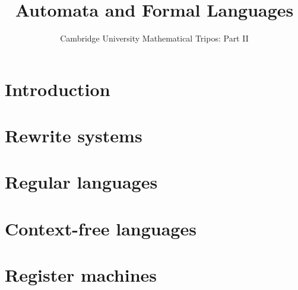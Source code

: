 \documentclass{article}
\title{Automata and Formal Languages}
\author{Cambridge University Mathematical Tripos: Part II}
\begin{document}
\maketitle

\tableofcontentsnewpage{}

\section{Introduction}

\section{Rewrite systems}

\section{Regular languages}

\section{Context-free languages}

\section{Register machines}

\end{document}

